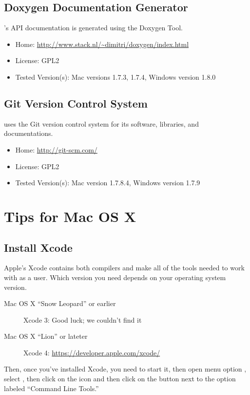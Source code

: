 \subsection{Doxygen Documentation Generator}

\Stan's API documentation is generated using the Doxygen Tool.
%
\begin{itemize}
\item Home: \url{http://www.stack.nl/~dimitri/doxygen/index.html}
\item License: GPL2
\item Tested Version(s): Mac versions 1.7.3, 1.7.4, Windows version 1.8.0
\end{itemize}


\subsection{Git Version Control System}

\Stan uses the Git version control system for its software, libraries,
and documentations.  
% 
\begin{itemize}
\item Home: \url{http://git-scm.com/}
\item License: GPL2
\item Tested Version(s): Mac version 1.7.8.4, Windows version 1.7.9
\end{itemize}



\section{Tips for Mac OS X}

\subsection{Install Xcode}

Apple's Xcode contains both compilers and make all of the tools needed 
to work with \Stan as a user.  Which version you need depends on your
operating system version.

\begin{description}
\item[Mac OS X ``Snow Leopard'' or earlier]
Xcode 3: Good luck; we couldn't find it
\item[Mac OS X ``Lion'' or lateter]
Xcode 4: \url{https://developer.apple.com/xcode/}
\end{description}

Then, once you've installed Xcode, you need to start it, then open
menu option , select , then click on the
 icon and then click on the  button next
to the option labeled ``Command Line Tools.''

